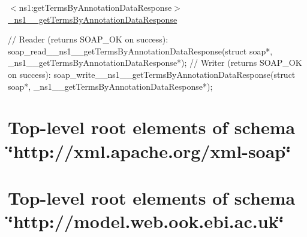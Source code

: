 \begin{DoxyItemize}
\item $<$ns1:getTermsByAnnotationDataResponse$>$ \hyperlink{class__ns1____getTermsByAnnotationDataResponse}{\_\-ns1\_\-\_\-getTermsByAnnotationDataResponse} 
\begin{DoxyCode}
    // Reader (returns SOAP_OK on success):
    soap_read__ns1__getTermsByAnnotationDataResponse(struct soap*, 
      _ns1__getTermsByAnnotationDataResponse*);
    // Writer (returns SOAP_OK on success):
    soap_write__ns1__getTermsByAnnotationDataResponse(struct soap*, 
      _ns1__getTermsByAnnotationDataResponse*);
\end{DoxyCode}

\end{DoxyItemize}\hypertarget{page_XMLDataBinding_ns2}{}\section{Top-\/level root elements of schema \char`\"{}http://xml.apache.org/xml-\/soap\char`\"{}}\label{page_XMLDataBinding_ns2}
\hypertarget{page_XMLDataBinding_ns3}{}\section{Top-\/level root elements of schema \char`\"{}http://model.web.ook.ebi.ac.uk\char`\"{}}\label{page_XMLDataBinding_ns3}
